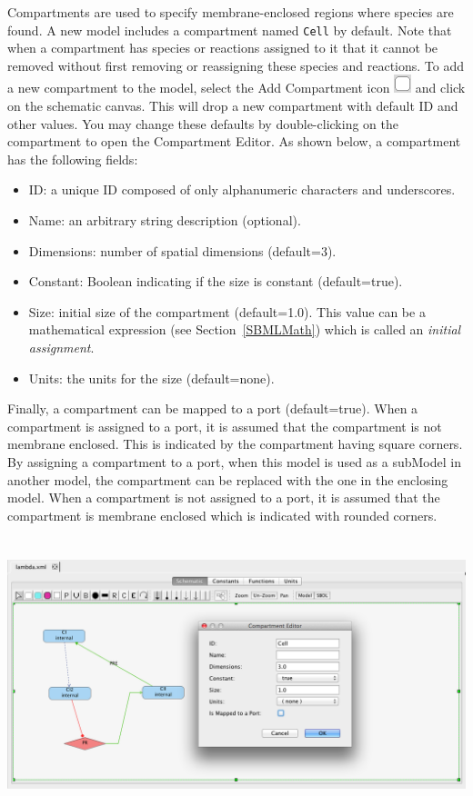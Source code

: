\documentclass[titlepage,11pt]{article}
\begin{document}
\noindent
Compartments are used to specify membrane-enclosed regions where species are found. A new model includes a compartment named {\tt Cell} by default.  Note that when a compartment has species or reactions assigned to it that it cannot be removed without first removing or reassigning these species and reactions.  To add a new compartment to the model, select the Add Compartment icon \includegraphics{../gui/icons/modelview/add_compartment_selected} and click on the schematic canvas.  This will drop a new compartment with default ID and other values.  You may change these defaults by double-clicking on the compartment to open the Compartment Editor.  
As shown below, a compartment has the following fields:
\begin{itemize}
\item ID: a unique ID composed of only alphanumeric characters and underscores.
\item Name: an arbitrary string description (optional).
\item Dimensions: number of spatial dimensions (default=3).
\item Constant: Boolean indicating if the size is constant (default=true).
\item Size: initial size of the compartment (default=1.0).  This value can be a mathematical expression (see Section~\ref{SBMLMath}) which is called an \emph{initial assignment}.
\item Units: the units for the size (default=none).
\end{itemize}
Finally, a compartment can be mapped to a port (default=true).  When a compartment is assigned to a port, it is assumed that the compartment is not membrane enclosed.  This is indicated by the compartment having square corners.  By assigning a compartment to a port, when this model is used as a subModel in another model, the compartment can be replaced with the one in the enclosing model.  When a compartment is not assigned to a port, it is assumed that the compartment is membrane enclosed which is indicated with rounded corners.

\begin{center}
\includegraphics[height=80mm]{screenshots/compartment}
\end{center}
\end{document}
